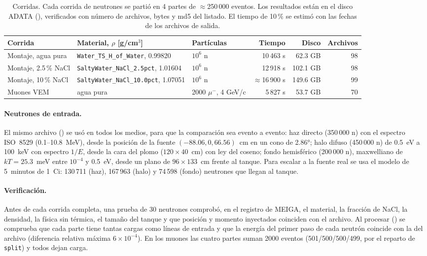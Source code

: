 \documentclass[11pt,a4paper]{article}
\begin{document}
\begin{table}[H]\centering\footnotesize\setlength\tabcolsep{4pt}
\begin{tabular}{lllrrr}
\toprule
Corrida & Material, $\rho$ [g/cm$^3$] & Partículas & Tiempo & Disco & Archivos \\
\midrule
Montaje, agua pura & \texttt{Water\_TS\_H\_of\_Water}, 0.99820 & $10^6$ n & 10\,463 s & 62.3 GB & 98 \\
Montaje, 2.5\,\% NaCl & \texttt{SaltyWater\_NaCl\_2.5pct}, 1.01604 & $10^6$ n & 12\,918 s & 102.1 GB & 98 \\
Montaje, 10\,\% NaCl & \texttt{SaltyWater\_NaCl\_10.0pct}, 1.07051 & $10^6$ n & $\approx$16\,900 s & 149.6 GB & 99 \\
Muones VEM & agua pura & 2000 $\mu^-$, 4 GeV/c & 5\,827 s & 53.7 GB & 70 \\
\bottomrule
\end{tabular}
\caption{Corridas. Cada corrida de neutrones se partió en 4 partes de $\approx$250\,000 eventos. Los resultados
están en el disco ADATA (), verificados con número de archivos, bytes y md5
del listado. El tiempo de 10\,\% se estimó con las fechas de los archivos de salida.}
\end{table}

\paragraph{Neutrones de entrada.} El mismo archivo ()
se usó en todos los medios, para que la comparación sea evento a evento:
haz directo (350\,000 n) con el espectro ISO~8529 (0.1--10.8~MeV), desde la posición de la fuente
$(-88.06, 0, 66.56)$~cm en un cono de 2.86°; halo difuso (450\,000 n) de 0.5~eV a 100~keV con espectro
$1/E$, desde la cara del plomo ($120\times40$~cm) con ley del coseno; fondo hemisférico (200\,000 n),
maxwelliano de $kT=25.3$~meV entre $10^{-4}$ y 0.5~eV, desde un plano de $96\times133$~cm frente al tanque.
Para escalar a la fuente real se usa el modelo de 5~minutos de 1~Ci: 130\,711 (haz), 167\,963 (halo) y
74\,598 (fondo) neutrones que llegan al tanque.

\paragraph{Verificación.} Antes de cada corrida completa, una prueba de 30 neutrones comprobó, en el registro
de MEIGA, el material, la fracción de NaCl, la densidad, la física sin térmica, el tamaño del tanque y que
posición y momento inyectados coinciden con el archivo. Al procesar ()
se comprueba que cada parte tiene tantas cargas como líneas de entrada y que la energía del primer paso de
cada neutrón coincide con la del archivo (diferencia relativa máxima $6\times10^{-4}$).
En los muones las cuatro partes suman 2000 eventos (501/500/500/499, por el reparto de \texttt{split}) y todos
dejan carga.
\end{document}
